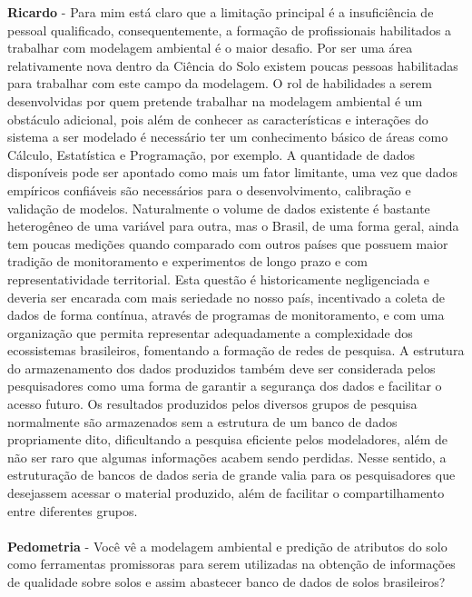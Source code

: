 \textbf{Ricardo} - Para mim está claro que a limitação principal é a insuficiência de pessoal qualificado, consequentemente, a formação de profissionais habilitados a trabalhar com modelagem ambiental é o maior desafio. Por ser uma área relativamente nova dentro da Ciência do Solo existem poucas pessoas habilitadas para trabalhar com este campo da modelagem. O rol de habilidades a serem desenvolvidas por quem pretende trabalhar na modelagem ambiental é um obstáculo adicional, pois além de conhecer as características e interações do sistema a ser modelado é necessário ter um conhecimento básico de áreas como Cálculo, Estatística e Programação, por exemplo. A quantidade de dados disponíveis pode ser apontado como mais um fator limitante, uma vez que dados empíricos confiáveis são necessários para o desenvolvimento, calibração e validação de modelos. Naturalmente o volume de dados existente é bastante heterogêneo de uma variável para outra, mas o Brasil, de uma forma geral, ainda tem poucas medições quando comparado com outros países que possuem maior tradição de monitoramento e experimentos de longo prazo e com representatividade territorial. Esta questão é historicamente negligenciada e deveria ser encarada com mais seriedade no nosso país, incentivado a coleta de dados de forma contínua, através de programas de monitoramento, e com uma organização que permita representar adequadamente a complexidade dos ecossistemas brasileiros, fomentando a formação de redes de pesquisa. A estrutura do armazenamento dos dados produzidos também deve ser considerada pelos pesquisadores como uma forma de garantir a segurança dos dados e facilitar o acesso futuro. Os resultados produzidos pelos diversos grupos de pesquisa normalmente são armazenados sem a estrutura de um banco de dados propriamente dito, dificultando a pesquisa eficiente pelos modeladores, além de não ser raro que algumas informações acabem sendo perdidas. Nesse sentido, a estruturação de bancos de dados seria de grande valia para os pesquisadores que desejassem acessar o material produzido, além de facilitar o compartilhamento entre diferentes grupos.\\
\\
\textbf{Pedometria} - Você vê a modelagem ambiental e predição de atributos do solo como ferramentas promissoras para serem utilizadas na obtenção de informações de qualidade sobre solos e assim abastecer banco de dados de solos brasileiros?\\
\\
